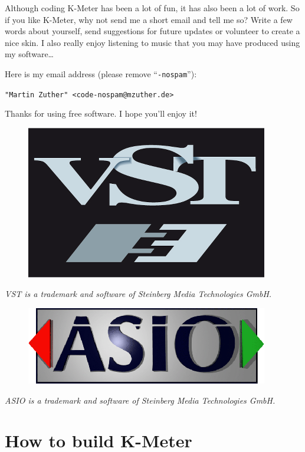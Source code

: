 Although coding K-Meter has been a lot of fun, it has also been a lot
of work.  So if you like K-Meter, why not send me a short email and
tell me so?  Write a few words about yourself, send suggestions for
future updates or volunteer to create a nice skin.  I also really
enjoy listening to music that you may have produced using my
software\dots

Here is my email address (please remove ``\texttt{-nospam}''):

\begin{center}
  \texttt{"Martin Zuther" <code-nospam@mzuther.de>}
\end{center}

Thanks for using free software.  I hope you'll enjoy it!

\begin{figure}
  \includegraphics[scale=0.40,clip]{include/images/trademark_vst.png}
\end{figure}

\emph{VST is a trademark and software of Steinberg Media Technologies
  GmbH.}

\begin{figure}
  \includegraphics[scale=0.60,clip]{include/images/trademark_asio.png}
\end{figure}

\emph{ASIO is a trademark and software of Steinberg Media Technologies
  GmbH.}

\appendix

\chapter{How to build K-Meter}
\label{chap:build_kmeter}


